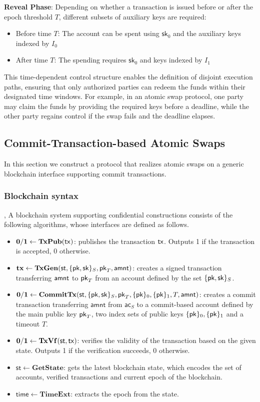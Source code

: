 \textbf{Reveal Phase}: Depending on whether a transaction is issued before or after the epoch threshold $T$, different subsets of auxiliary keys are required:
\begin{itemize}
    \item Before time $T$: The account can be spent using $\mathsf{sk}_0$ and the auxiliary keys indexed by $I_0$
    \item After time $T$: The spending requires $\mathsf{sk}_0$ and keys indexed by $I_1$
\end{itemize}
This time-dependent control structure enables the definition of disjoint execution paths, ensuring that only authorized parties can redeem the funds within their designated time windows. For example, in an atomic swap protocol, one party may claim the funds by providing the required keys before a deadline, while the other party regains control if the swap fails and the deadline elapses.

\subsection{Commit-Transaction-based Atomic Swaps}
In this section we construct a protocol that realizes atomic swaps on a generic blockchain interface supporting commit transactions.

\subsubsection{Blockchain syntax}

, A blockchain system supporting confidential constructions consists of the following algorithms, whose interfaces are defined as follows.
\begin{itemize}[topsep=0pt, itemsep=0pt, leftmargin=2em]
    \item $\mathbf{0/1} \gets \mathbf{TxPub}(\mathsf{tx})$: publishes the transaction $\mathsf{tx}$. Outputs 1 if the transaction is accepted, 0 otherwise.
    \item $\mathbf{tx}  \gets \mathbf{TxGen}(\st, \{ \pk, \sk \}_S, \pk_T, \amnt)$: creates a signed transaction transferring $\mathsf{amnt}$ to $\mathsf{pk}_T$ from an account defined by the set $\{ \mathsf{pk}, \mathsf{sk} \}_S$.
\item $\mathbf{0/1} \gets \mathbf{CommitTx}(\st, \{ \pk, \sk \}_S, \mathsf{pk}_T, \{ \pk \}_0, \{ \pk \}_1, T, \amnt)$: creates a commit transaction transferring $\mathsf{amnt}$ from $\mathsf{ac}_S$ to a commit-based account defined by the main public key $\mathsf{pk}_T$, two index sets of public keys $\{ \mathsf{pk} \}_0, \{ \mathsf{pk} \}_1$ and a timeout $T$.
    \item $\mathbf{0/1} \gets \mathbf{TxVf}(\st, \tx)$: verifies the validity of the transaction based on the given state. Outputs 1 if the verification succeeds, 0 otherwise.
    \item $\mathsf{st} \gets \mathbf{GetState}$: gets the latest blockchain state, which encodes the set of accounts, verified transactions and current epoch of the blockchain.
    \item $\mathsf{time} \gets \mathbf{TimeExt}$: extracts the epoch from the state.
\end{itemize}

